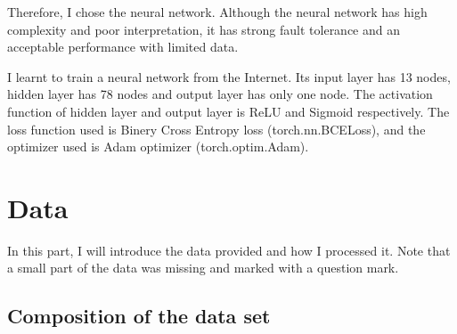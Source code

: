 \documentclass[lettersize,journal]{IEEEtran}
\begin{document}
Therefore, I chose the neural network. Although the neural network has high complexity and poor interpretation, it has strong fault tolerance and an acceptable performance with limited data.

I learnt to train a neural network from the Internet\cite{ref1}. Its input layer has 13 nodes, hidden layer has 78 nodes and output layer has only one node. The activation function of hidden layer and output layer is ReLU and Sigmoid respectively. The loss function used is Binery Cross Entropy loss (torch.nn.BCELoss), and the optimizer used is Adam optimizer (torch.optim.Adam).

\section{Data}

In this part, I will introduce the data provided and how I processed it. Note that a small part of the data was missing and marked with a question mark.

\subsection{Composition of the data set}
\end{document}
